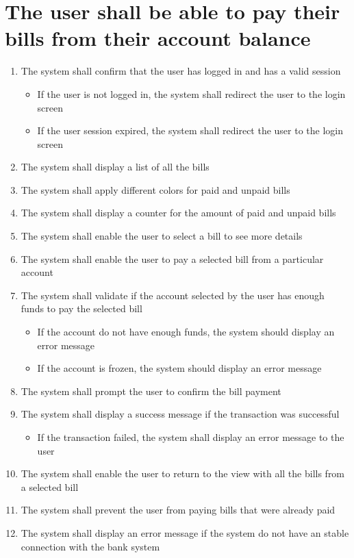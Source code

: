 \section{The user shall be able to pay their bills from their account balance}
\begin{enumerate}
    \item The system shall confirm that the user has logged in and has a valid 
    session
    \begin{itemize}
        \item If the user is not logged in, the system shall redirect the user 
        to the login screen
        \item If the user session expired, the system shall redirect the user 
        to the login screen
    \end{itemize}
    \item The system shall display a list of all the bills 
    \item The system shall apply different colors for paid and unpaid bills
    \item The system shall display a counter for the amount of paid and unpaid 
    bills
    \item The system shall enable the user to select a bill to see more details 
    \item The system shall enable the user to pay a selected bill from a 
    particular account
    \item The system shall validate if the account selected by the user has 
    enough funds to pay the selected bill
    \begin{itemize}
        \item If the account do not have enough funds, the system should 
        display an error message
	    \item If the account is frozen, the system should display an error 
        message
    \end{itemize}
    \item The system shall prompt the user to confirm the bill payment
    \item The system shall display a success message if the transaction was 
    successful 
    \begin{itemize}
        \item If the transaction failed, the system shall display an error 
        message to the user
    \end{itemize}
    \item The system shall enable the user to return to the view with all the 
    bills from a selected bill
    \pagebreak
    \item The system shall prevent the user from paying bills that were already 
    paid
    \item The system shall display an error message if the system do not have 
    an stable connection with the bank system
\end{enumerate}